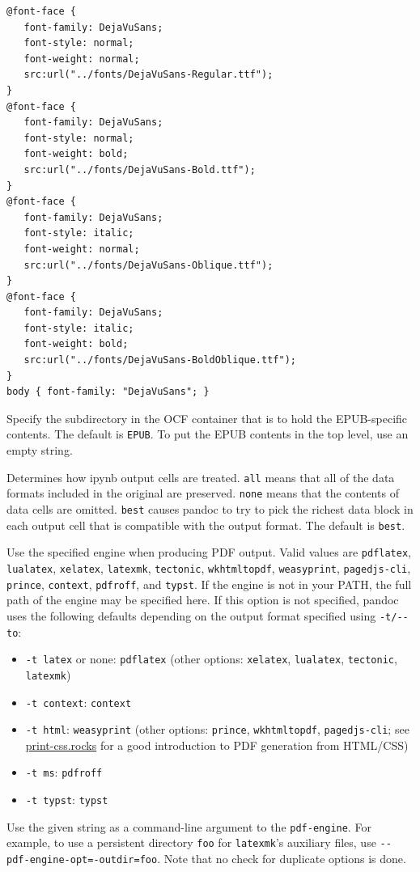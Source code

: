 \documentclass[
  b5paper
]{book}
\providecommand{\tightlist}{%
  \setlength{\itemsep}{0pt}\setlength{\parskip}{0pt}}
\begin{document}
\begin{description}
\begin{verbatim}
@font-face {
   font-family: DejaVuSans;
   font-style: normal;
   font-weight: normal;
   src:url("../fonts/DejaVuSans-Regular.ttf");
}
@font-face {
   font-family: DejaVuSans;
   font-style: normal;
   font-weight: bold;
   src:url("../fonts/DejaVuSans-Bold.ttf");
}
@font-face {
   font-family: DejaVuSans;
   font-style: italic;
   font-weight: normal;
   src:url("../fonts/DejaVuSans-Oblique.ttf");
}
@font-face {
   font-family: DejaVuSans;
   font-style: italic;
   font-weight: bold;
   src:url("../fonts/DejaVuSans-BoldOblique.ttf");
}
body { font-family: "DejaVuSans"; }
\end{verbatim}
\item[\texttt{-\/-epub-subdirectory=}\emph{DIRNAME}]
Specify the subdirectory in the OCF container that is to hold the
EPUB-specific contents. The default is \texttt{EPUB}. To put the EPUB
contents in the top level, use an empty string.
\item[\texttt{-\/-ipynb-output=all\textbar{}none\textbar{}best}]
Determines how ipynb output cells are treated. \texttt{all} means that
all of the data formats included in the original are preserved.
\texttt{none} means that the contents of data cells are omitted.
\texttt{best} causes pandoc to try to pick the richest data block in
each output cell that is compatible with the output format. The default
is \texttt{best}.
\item[\texttt{-\/-pdf-engine=}\emph{PROGRAM}]
Use the specified engine when producing PDF output. Valid values are
\texttt{pdflatex}, \texttt{lualatex}, \texttt{xelatex},
\texttt{latexmk}, \texttt{tectonic}, \texttt{wkhtmltopdf},
\texttt{weasyprint}, \texttt{pagedjs-cli}, \texttt{prince},
\texttt{context}, \texttt{pdfroff}, and \texttt{typst}. If the engine is
not in your PATH, the full path of the engine may be specified here. If
this option is not specified, pandoc uses the following defaults
depending on the output format specified using \texttt{-t/-\/-to}:

\begin{itemize}
\tightlist
\item
  \texttt{-t\ latex} or none: \texttt{pdflatex} (other options:
  \texttt{xelatex}, \texttt{lualatex}, \texttt{tectonic},
  \texttt{latexmk})
\item
  \texttt{-t\ context}: \texttt{context}
\item
  \texttt{-t\ html}: \texttt{weasyprint} (other options:
  \texttt{prince}, \texttt{wkhtmltopdf}, \texttt{pagedjs-cli}; see
  \href{https://print-css.rocks}{print-css.rocks} for a good
  introduction to PDF generation from HTML/CSS)
\item
  \texttt{-t\ ms}: \texttt{pdfroff}
\item
  \texttt{-t\ typst}: \texttt{typst}
\end{itemize}
\item[\texttt{-\/-pdf-engine-opt=}\emph{STRING}]
Use the given string as a command-line argument to the
\texttt{pdf-engine}. For example, to use a persistent directory
\texttt{foo} for \texttt{latexmk}'s auxiliary files, use
\texttt{-\/-pdf-engine-opt=-outdir=foo}. Note that no check for
duplicate options is done.
\end{description}
\end{document}
